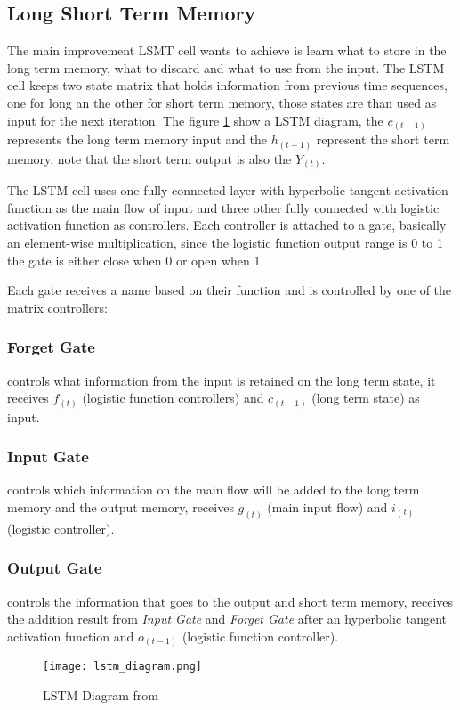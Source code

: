 \subsection{Long Short Term Memory}
\label{sec:lstm}

The main improvement LSMT cell wants to achieve is learn what to store in the long term memory, what to discard and what to use from the input.
The LSTM cell keeps two state matrix that holds information from previous time sequences,
one for long an the other for short term memory,
those states are than used as input for the next iteration.
The figure \ref{fig:lstm_diagram} show a LSTM diagram, the $c_{(t-1)}$ represents the long term memory input
and the $h_{(t-1)}$ represent the short term memory, note that the short term output is also the $Y_{(t)}$.

The LSTM cell uses one fully connected layer with hyperbolic tangent activation function as the main flow of input
and three other fully connected with logistic activation function as controllers.
Each controller is attached to a gate, basically an element-wise multiplication,
since the logistic function output range is 0 to 1 the gate is either close when 0 or open when 1.

Each gate receives a name based on their function and is controlled by one of the matrix controllers:
\subsubsection{Forget Gate} controls what information from the input is retained on the long term state,
it receives $f_{(t)}$ (logistic function controllers) and $c_{(t-1)}$ (long term state) as input.
\subsubsection{Input Gate} controls which information on the main flow will be added to the long term memory and the output memory,
receives $g_{(t)}$ (main input flow) and $i_{(t)}$ (logistic controller).
\subsubsection{Output Gate} controls the information that goes to the output and short term memory,
receives the addition result from \textit{Input Gate} and \textit{Forget Gate} after an hyperbolic tangent activation function and $o_{(t-1)}$ (logistic function controller).

\begin{figure}
	\centering
	\texttt{[image: lstm\_diagram.png]}
	\caption{LSTM Diagram from \cite{geron2017hands}\label{fig:lstm_diagram}}
\end{figure}



